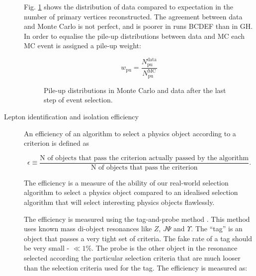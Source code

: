 \begin{description}
Fig. \ref{fig:L4_1l4j2b2w_nvtx} shows the distribution of data compared to expectation in the number of primary vertices reconstructed. The agreement between data and Monte Carlo is not perfect, and is poorer in runs BCDEF than in GH. In order to equalise the pile-up distributions between data and MC each MC event is assigned a pile-up weight:

\begin{equation}
w_{\text{pu}}=\frac{N^{\text{data}}_{\text{pu}}}{N^{\text{MC}}_{\text{pu}}}
\end{equation}

\begin{figure}[htp]
\centering
  \def\twidth{0.45}
  \centering
  \hfil
\caption{Pile-up distributions in Monte Carlo and data after the last step of event selection. }
\label{fig:L4_1l4j2b2w_nvtx}
\end{figure}


\item[Lepton identification and isolation efficiency]

An efficiency of an algorithm to select a physics object according to a criterion is defined as 

\begin{equation}
\epsilon\equiv\frac{\text{N of objects that pass the criterion actually passed by the algorithm}}{\text{N of objects that pass the criterion}}.
\end{equation}

The efficiency is a measure of the ability of our real-world selection algorithm to select a physics object compared to an idealised selection algorithm that will select interesting physics objects flawlessly.

The efficiency is measured using the tag-and-probe method \cite{CMS-AN-2009-111}. This method uses known mass di-object resonances like $Z$, $J\Psi$ and $\Upsilon$. The ``tag'' is an object that passes a very tight set of criteria. The fake rate of a tag should be very small - $\ll 1\%$. The probe is the other object in the resonance selected according the particular selection criteria that are much looser than the selection criteria used for the tag. The efficiency is measured as:


\end{description}
